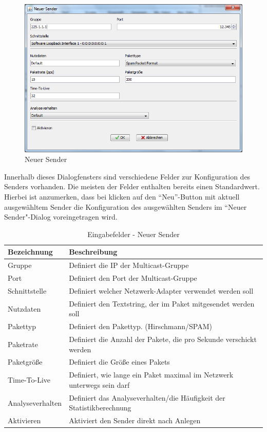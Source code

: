 \begin{figure}[htbp]
\begin{center}
\includegraphics[width=14cm]{images/addSender.png}
\caption[Neuer Sender]{Neuer Sender}
\label{newSender}
\end{center}
\end{figure}

Innerhalb dieses Dialogfensters sind verschiedene Felder zur Konfiguration des
Senders vorhanden. Die meisten der Felder enthalten bereits einen Standardwert.
Hierbei ist anzumerken, dass bei klicken auf den ``Neu''-Button mit aktuell
ausgewähltem Sender die Konfiguration des ausgewählten
Senders im ``Neuer Sender"-Dialog voreingetragen wird.

\begin{table}[h]
\caption{Eingabefelder - Neuer Sender}
\label{tab:inputNewSender}
\begin{center}
\begin{tabular}{|l|p{10cm}|}
\hline
\textbf{Bezeichnung} & \textbf{Beschreibung}\\
\hline
Gruppe & Definiert die IP der Multicast-Gruppe\\
\hline
Port & Definiert den Port der Multicast-Gruppe\\
\hline
Schnittstelle & Definiert welcher Netzwerk-Adapter verwendet werden soll\\
\hline
Nutzdaten & Definiert den Textstring, der im Paket mitgesendet werden soll\\
\hline
Pakettyp & Definiert den Pakettyp. (Hirschmann/SPAM)\\
\hline
Paketrate & Definiert die Anzahl der Pakete, die pro Sekunde verschickt werden\\
\hline
Paketgröße & Definiert die Größe eines Pakets\\
\hline
Time-To-Live & Definiert, wie lange ein Paket maximal im Netzwerk unterwegs sein
darf\\
\hline
Analyseverhalten & Definiert das Analyseverhalten/die Häufigkeit der
Statistikberechnung\\
\hline
 Aktivieren & Aktiviert den Sender direkt nach Anlegen\\
\hline
\end{tabular}
\end{center}
\label{default}
\end{table}

